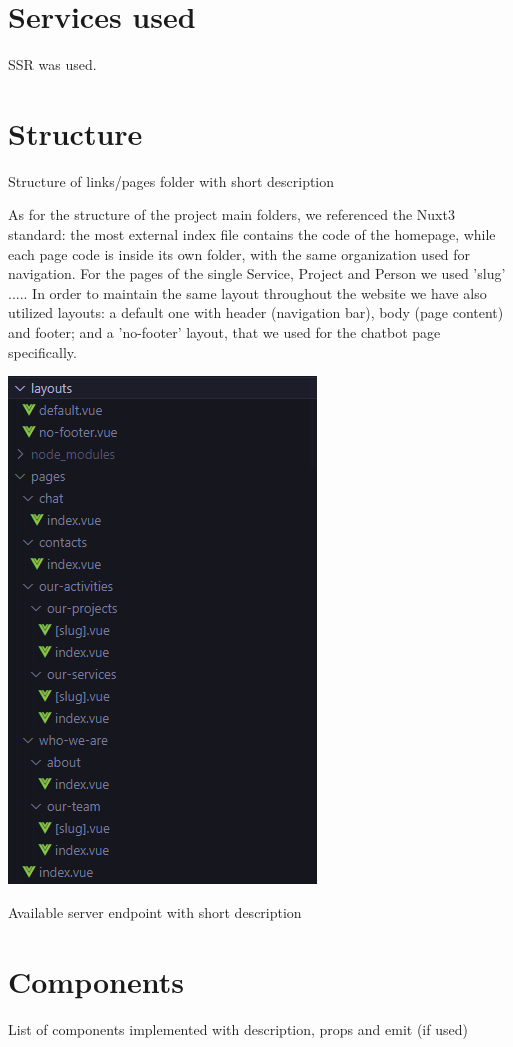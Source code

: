 \section{Services used}
SSR was used. %

\section{Structure}
Structure of links/pages folder with short description

As for the structure of the project main folders, we referenced the Nuxt3 standard: the most external index file
contains the code of the homepage, while each page code is inside its own folder, with the same organization used for navigation.
For the pages of the single Service, Project and Person we used 'slug' .....
In order to maintain the same layout throughout the website we have also utilized layouts: a default one with header (navigation bar), body (page content) and footer;
and a 'no-footer' layout, that we used for the chatbot page specifically.


\begin{center}
    \includegraphics[width=0.4\linewidth]{img/folders-structure.png}
\end{center}

\vspace{1em}
Available server endpoint with short description

\section{Components}
List of components implemented with description, props and emit (if used)

